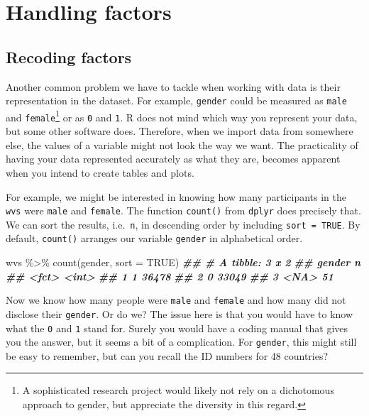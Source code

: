 \documentclass[
]{book}
\newenvironment{Shaded}{\begin{snugshade}}{\end{snugshade}}
\newcommand{\AttributeTok}[1]{\textcolor[rgb]{0.77,0.63,0.00}{#1}}
\newcommand{\ConstantTok}[1]{\textcolor[rgb]{0.00,0.00,0.00}{#1}}
\newcommand{\DocumentationTok}[1]{\textcolor[rgb]{0.56,0.35,0.01}{\textbf{\textit{#1}}}}
\newcommand{\FunctionTok}[1]{\textcolor[rgb]{0.00,0.00,0.00}{#1}}
\newcommand{\NormalTok}[1]{#1}
\newcommand{\SpecialCharTok}[1]{\textcolor[rgb]{0.00,0.00,0.00}{#1}}
\begin{document}
\hypertarget{handling-factors}{%
\section{Handling factors}\label{handling-factors}}

\hypertarget{recoding-factors}{%
\subsection{Recoding factors}\label{recoding-factors}}

Another common problem we have to tackle when working with data is their representation in the dataset. For example, \texttt{gender} could be measured as \texttt{male} and \texttt{female}\footnote{A sophisticated research project would likely not rely on a dichotomous approach to gender, but appreciate the diversity in this regard.} or as \texttt{0} and \texttt{1}. R does not mind which way you represent your data, but some other software does. Therefore, when we import data from somewhere else, the values of a variable might not look the way we want. The practicality of having your data represented accurately as what they are, becomes apparent when you intend to create tables and plots.

For example, we might be interested in knowing how many participants in the \texttt{wvs} were \texttt{male} and \texttt{female}. The function \texttt{count()} from \texttt{dplyr} does precisely that. We can sort the results, i.e.~\texttt{n}, in descending order by including \texttt{sort\ =\ TRUE}. By default, \texttt{count()} arranges our variable \texttt{gender} in alphabetical order.

\begin{Shaded}
\begin{Highlighting}[]
\NormalTok{wvs }\SpecialCharTok{\%\textgreater{}\%} \FunctionTok{count}\NormalTok{(gender, }\AttributeTok{sort =} \ConstantTok{TRUE}\NormalTok{)}
\DocumentationTok{\#\# \# A tibble: 3 x 2}
\DocumentationTok{\#\#   gender     n}
\DocumentationTok{\#\#   \textless{}fct\textgreater{}  \textless{}int\textgreater{}}
\DocumentationTok{\#\# 1 1      36478}
\DocumentationTok{\#\# 2 0      33049}
\DocumentationTok{\#\# 3 \textless{}NA\textgreater{}      51}
\end{Highlighting}
\end{Shaded}

Now we know how many people were \texttt{male} and \texttt{female} and how many did not disclose their \texttt{gender}. Or do we? The issue here is that you would have to know what the \texttt{0} and \texttt{1} stand for. Surely you would have a coding manual that gives you the answer, but it seems a bit of a complication. For \texttt{gender}, this might still be easy to remember, but can you recall the ID numbers for 48 countries?
\end{document}
